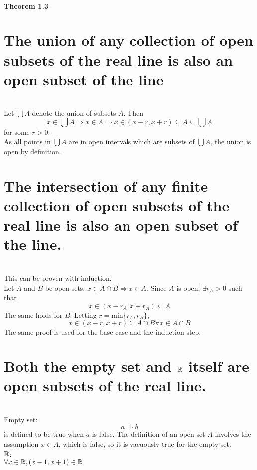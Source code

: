 \subsection{Theorem 1.3}

\question

\begin{parts}
 
 \part{The union of any collection of open subsets of the real line is also an open subset of the line}
 
 
\begin{solution}
 \\ Let $\bigcup A$ denote the union of subsets $A$. Then
$$x \in \bigcup A \Rightarrow x \in A \Rightarrow x \in (x-r,x+r) \subseteq A \subseteq \bigcup A$$
for some $r > 0$. \\
As all points in $\bigcup A$ are in open intervals which are subsets of $\bigcup A$, the union is open by definition.
\end{solution}

\part{The intersection of any finite collection of open subsets of the real line is also an open subset of the line.}

\begin{solution}
 \\This can be proven with induction. \\
Let $A$ and $B$ be open sets. $x \in A \cap B \Rightarrow x \in A$. Since $A$ is open, $\exists r_A > 0$ such that
$$x \in (x-r_A,x+r_A) \subseteq A$$
The same holds for $B$. Letting $r = \text{min}\{r_A,r_B\}$,
$$x \in (x-r,x+r) \subseteq A \cap B \forall x \in A \cap B$$
The same proof is used for the base case and the induction step.
\end{solution}

\part{Both the empty set and $\mathbb{R}$ itself are open subsets of the real line.}

\begin{solution}
 \\Empty set: \\
 $$a \Rightarrow b$$
 is defined to be true when $a$ is false. The definition of an open set $A$ involves the assumption $x \in A$, which is false, so it is vacuously true for the empty set. \\
 $\mathbb{R}$: \\
 $\forall x \in \mathbb{R}, (x-1,x+1) \in \mathbb{R}$
\end{solution}

\end{parts}

